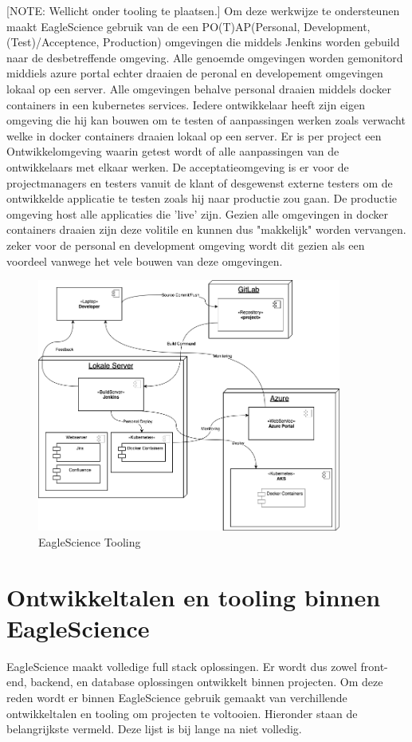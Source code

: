 [NOTE: Wellicht onder tooling te plaatsen.]
Om deze werkwijze te ondersteunen maakt EagleScience gebruik van de een PO(T)AP(Personal, Development, (Test)/Acceptence, Production) omgevingen die middels Jenkins worden gebuild naar de desbetreffende omgeving. Alle genoemde omgevingen worden gemonitord middiels azure portal echter draaien de peronal en developement omgevingen lokaal op een server. Alle omgevingen behalve personal draaien middels docker containers in een kubernetes services. Iedere ontwikkelaar heeft zijn eigen omgeving die hij kan bouwen om te testen of aanpassingen werken zoals verwacht welke in docker containers draaien lokaal op een server. Er is per project een Ontwikkelomgeving waarin getest wordt of alle aanpassingen van de ontwikkelaars met elkaar werken. De acceptatieomgeving is er voor de projectmanagers en testers vanuit de klant of desgewenst externe testers om de ontwikkelde applicatie te testen zoals hij naar productie zou gaan. De productie omgeving host alle applicaties die 'live' zijn. Gezien alle omgevingen in docker containers draaien zijn deze volitile en kunnen dus "makkelijk" worden vervangen. zeker voor de personal en development omgeving wordt dit gezien als een voordeel vanwege het vele bouwen van deze omgevingen.

\begin{figure}[bth]
    \myfloatalign
    \includegraphics[width=10cm]{gfx/ES-BuildArchitecture}
    \caption{EagleScience Tooling}
    \label{fig:es-tooling}
\end{figure}



\section{Ontwikkeltalen en tooling binnen EagleScience}\label{sec:ontwikkeltalen-en-tooling-binnen-eaglescience}
EagleScience maakt volledige full stack oplossingen. Er wordt dus zowel front-end, backend, en database oplossingen ontwikkelt binnen projecten. Om deze reden wordt er binnen EagleScience gebruik gemaakt van verchillende ontwikkeltalen en tooling om projecten te voltooien. Hieronder staan de belangrijkste vermeld. Deze lijst is bij lange na niet volledig.

